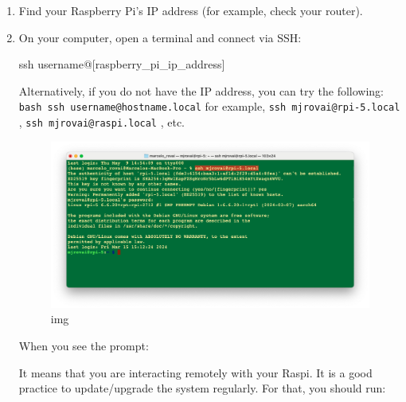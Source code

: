 \documentclass[
]{article}
\newenvironment{Shaded}{\begin{snugshade}}{\end{snugshade}}
\newcommand{\ExtensionTok}[1]{\textcolor[rgb]{0.00,0.23,0.31}{#1}}
\newcommand{\FunctionTok}[1]{\textcolor[rgb]{0.28,0.35,0.67}{#1}}
\newcommand{\NormalTok}[1]{\textcolor[rgb]{0.00,0.23,0.31}{#1}}
\newcommand{\PreprocessorTok}[1]{\textcolor[rgb]{0.68,0.00,0.00}{#1}}
\newcommand{\SpecialStringTok}[1]{\textcolor[rgb]{0.13,0.47,0.30}{#1}}
\begin{document}
\begin{enumerate}
\def\labelenumi{\arabic{enumi}.}
\item
  Find your Raspberry Pi's IP address (for example, check your router).
\item
  On your computer, open a terminal and connect via SSH:

\begin{Shaded}
\begin{Highlighting}[]
\FunctionTok{ssh}\NormalTok{ username@}\PreprocessorTok{[}\SpecialStringTok{raspberry\_pi\_ip\_address}\PreprocessorTok{]}
\end{Highlighting}
\end{Shaded}

  Alternatively, if you do not have the IP address, you can try the
  following: \texttt{bash\ ssh\ username@hostname.local} for example,
  \texttt{ssh\ mjrovai@rpi-5.local} , \texttt{ssh\ mjrovai@raspi.local}
  , etc.

  \begin{figure}[H]

  {\centering \includegraphics[width=0.85\linewidth,height=\textheight,keepaspectratio]{images/png/ssh.png}

  }

  \caption{img}

  \end{figure}%

  When you see the prompt:

\begin{Shaded}
\end{Shaded}

  It means that you are interacting remotely with your Raspi. It is a
  good practice to update/upgrade the system regularly. For that, you
  should run:


\end{enumerate}
\end{document}
